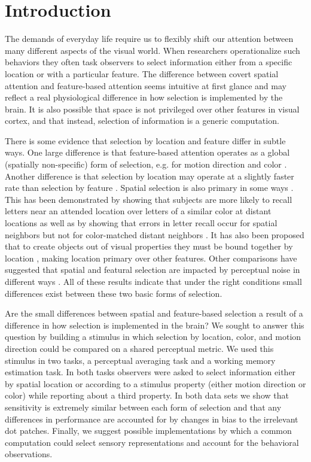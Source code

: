
\section{Introduction}

The demands of everyday life require us to flexibly shift our attention between many different aspects of the visual world. When researchers operationalize such behaviors they often task observers to select information either from a specific location or with a particular feature. The difference between covert spatial attention and feature-based attention seems intuitive at first glance and may reflect a real physiological difference in how selection is implemented by the brain. It is also possible that space is not privileged over other features in visual cortex, and that instead, selection of information is a generic computation.

There is some evidence that selection by location and feature differ in subtle ways. One large difference is that feature-based attention operates as a global (spatially non-specific) form of selection, e.g. for motion direction and color \citep{Saenz2002-fs}. Another difference is that selection by location may operate at a slightly faster rate than selection by feature \citep{Liu2007-ed,Hillyard1984-qk,Harter1982-vj}. Spatial selection is also primary in some ways \citep{Soto2004-cs,Tsal1988-qx}. This has been demonstrated by showing that subjects are more likely to recall letters near an attended location over letters of a similar color at distant locations \citep{Tsal1988-qx} as well as by showing that errors in letter recall occur for spatial neighbors but not for color-matched distant neighbors \citep{Snyder1972-og}. It has also been proposed that to create objects out of visual properties they must be bound together by location \citep{Treisman1980-gu}, making location primary over other features. Other comparisons have suggested that spatial and featural selection are impacted by perceptual noise in different ways \citep{Ling2009-rq}. All of these results indicate that under the right conditions small differences exist between these two basic forms of selection.

Are the small differences between spatial and feature-based selection a result of a difference in how selection is implemented in the brain? We sought to answer this question by building a stimulus in which selection by location, color, and motion direction could be compared on a shared perceptual metric. We used this stimulus in two tasks, a perceptual averaging task and a working memory estimation task. In both tasks observers were asked to select information either by spatial location or according to a stimulus property (either motion direction or color) while reporting about a third property. In both data sets we show that sensitivity is extremely similar between each form of selection and that any differences in performance are accounted for by changes in bias to the irrelevant dot patches. Finally, we suggest possible implementations by which a common computation could select sensory representations and account for the behavioral observations.

